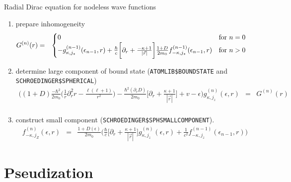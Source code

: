 \documentclass[11pt,a4paper]{report}
\begin{document}
\begin{myshadowminipage}{Radial Dirac equation for nodeless wave functions}
\begin{enumerate}
\item prepare inhomogeneity
\begin{eqnarray}
G^{(n)}(r)&=&
\begin{cases}
0&\text{for $n=0$}\\
 -g^{(n-1)}_{\kappa,j_z}(\epsilon_{n-1},r)
+
\frac{\hbar}{c}\biggl[\partial_r+\frac{-\kappa+1}{|\vec{r}|}\biggr]
\frac{1+D}{ 2m_0 }
f_{-\kappa,j_z}^{(n-1)}(\epsilon_{n-1},r)
&\text{for $n>0$\hspace{1cm}}\\
\end{cases}
\label{eq:raddiraca}
\end{eqnarray}
%
\item determine large component of bound state
  (\verb|ATOMLIB$BOUNDSTATE| 
and \verb|SCHROEDINGER$SPHERICAL|)
\begin{eqnarray}
\biggl(
(1+D)\frac{-\hbar^2}{2m_0}\biggl(\frac{1}{r}\partial_r^2r
-\frac{\ell(\ell+1)}{r^2}\biggr)
-\frac{\hbar^2(\partial_r D)}{2m_0}
\biggl[\partial_r
+\frac{\kappa+1}{|\vec{r}|}\biggr]
+v-\epsilon \biggr)g^{(n)}_{\kappa,j_z}(\epsilon,r)
&=& G^{(n)}(r)
\nonumber\\
\label{eq:raddiracb}
\end{eqnarray}

\item construct small component (\verb|SCHROEDINGER$SPHSMALLCOMPONENT|).
\begin{eqnarray}
f_{-\kappa,j_Z}^{(n)}(\epsilon,r)
&=&\frac{1+D(\epsilon)}{2 m_0}
\biggl(\frac{\hbar}{c}\biggl[\partial_r+\frac{\kappa+1}{|\vec{r}|}\biggr]
g_{\kappa,j_z}^{(n)}(\epsilon,r)
+
\frac{1}{c^2}f_{-\kappa,j_z}^{(n-1)}(\epsilon_{n-1},r)\biggr)
\label{eq:raddiracc}
\end{eqnarray}
\end{enumerate}
\end{myshadowminipage}

\section{Pseudization}
\label{sec:pseudiation}
\end{document}
